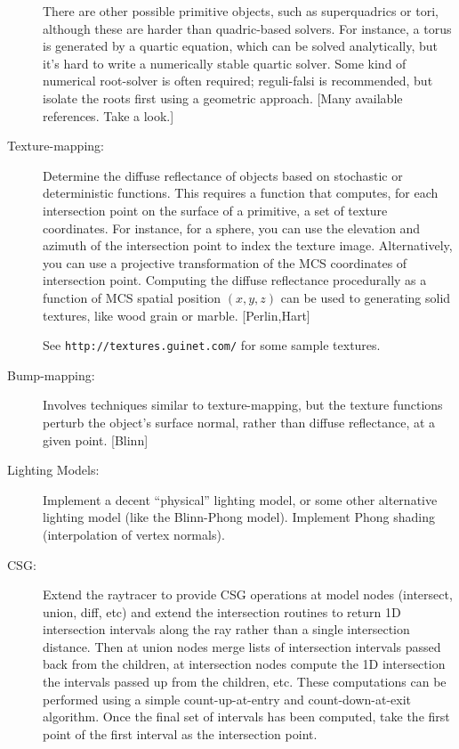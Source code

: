 \begin{description}
    There are other possible primitive objects,
    such as superquadrics or tori, although these are harder than
    quadric-based solvers.  For instance, a torus is generated by
    a quartic equation, which can be solved analytically, but
    it's hard to write a numerically stable quartic solver.   Some
    kind of numerical root-solver is often required; reguli-falsi
    is recommended, but isolate the roots first using a 
    geometric approach.
    [Many available references.  Take a look.]
\item[Texture-mapping:] Determine the diffuse reflectance of objects
    based on stochastic or deterministic functions.  
    This requires a function that computes, for each intersection
    point on the surface of a primitive, a set of texture coordinates.
    For instance, for a sphere, you can use the elevation and
    azimuth of the intersection point to index the texture image.
    Alternatively, you can use a projective transformation of
    the MCS coordinates of intersection point.
    Computing the diffuse reflectance procedurally
    as a function of MCS spatial position $(x,y,z)$ can be used to
    generating solid textures, like wood grain or marble. [Perlin,Hart]

    See {\tt http://textures.guinet.com/} for some sample textures.
\item[Bump-mapping:] Involves techniques similar to texture-mapping, but 
the texture functions perturb the object's surface normal, 
rather than diffuse reflectance, at a given point.    
[Blinn]
\item[Lighting Models:] Implement a decent ``physical'' lighting model,
or some other alternative lighting model (like the Blinn-Phong model).
Implement Phong shading (interpolation of vertex normals).
\item[CSG:] Extend the raytracer to provide CSG
operations at model nodes (intersect, union, diff, etc) and extend the
intersection routines to return 1D intersection intervals along the
ray rather than a single intersection distance.   
Then at union nodes merge lists of
intersection intervals passed back from the children, at intersection nodes 
compute the 1D intersection the intervals passed up from the children, etc.
These computations can be performed using a simple count-up-at-entry
and count-down-at-exit algorithm.   
Once the final set of intervals has been computed, take the
first point of the first interval as the intersection point.
\end{description}

